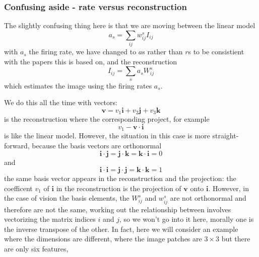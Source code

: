 \documentclass[11pt,a4paper]{scrartcl}
\begin{document}
\subsubsection*{Confusing aside - rate versus reconstruction}
The slightly confusing thing here is that we are moving between the linear model 
\begin{equation}
a_s=\sum_{ij} w^s_{ij}I_{ij}
\end{equation}
with $a_s$ the firing rate, we have changed to $a$s rather than $r$s
to be consistient with the papers this is based on, and the
reconstruction
\begin{equation}
I_{ij}=\sum_{s} a_sW^s_{ij}
\end{equation}
which estimates the image using the firing rates $a_s$.

 We do this all the time with vectors:
\begin{equation}
\textbf{v}=v_1\textbf{i}+v_2\textbf{j}+v_3\textbf{k}
\end{equation}
is the reconstruction where the corresponding project, for example
\begin{equation}
v_1-\textbf{v}\cdot\textbf{i}
\end{equation}
is like the linear model. However, the situation in this case is more straight-forward, because the basis vectors are orthonormal
\begin{equation}
\textbf{i}\cdot\textbf{j}=\textbf{j}\cdot\textbf{k}=\textbf{k}\cdot\textbf{i}=0
\end{equation}
and
\begin{equation}
\textbf{i}\cdot\textbf{i}=\textbf{j}\cdot\textbf{j}=\textbf{k}\cdot\textbf{k}=1
\end{equation}
the same basis vector appears in the reconstruction and the
projection: the coefficent $v_1$ of $\textbf{i}$ in the reconstruction
is the projection of $\textbf{v}$ onto $\textbf{i}$. However, in the
case of vision the basis elements, the $W^s_{ij}$ and $w^s_{ij}$ are
not orthonormal and therefore are not the same, working out the
relationship between involves vectorizing the matrix indices $i$ and
$j$, so we won't go into it here, morally one is the inverse transpose
of the other. In fact, here we will consider an example where the
dimensions are different, where the image patches are $3\times 3$ but
there are only six features, 
\end{document}
